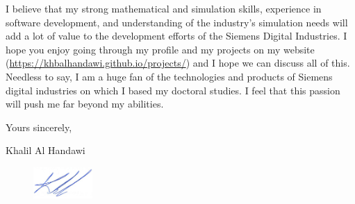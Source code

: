 \documentclass[12pt]{article} %
\begin{document}
\medskip %

I believe that my strong mathematical and simulation skills, experience in software development, and understanding of the industry's simulation needs will add a lot of value to the development efforts of the Siemens Digital Industries. I hope you enjoy going through my profile and my projects on my website (\href{https://khbalhandawi.github.io/projects/}{https://khbalhandawi.github.io/projects/}) and I hope we can discuss all of this. Needless to say, I am a huge fan of the technologies and products of Siemens digital industries on which I based my doctoral studies. I feel that this passion will push me far beyond my abilities.


\medskip %

Yours sincerely,

\medskip %

Khalil Al Handawi

\begin{figure}[h]
	\includegraphics[width=0.2\textwidth]{Signiture.png}
\end{figure}

\medskip %

\end{document}

